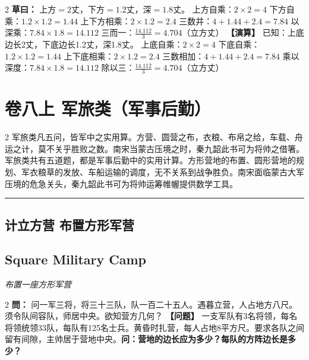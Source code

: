 \documentclass[11pt,a4paper]{article}
\newcommand{\longline}{\noindent\rule{\textwidth}{0.4pt}}
\newcommand{\bilingualProblem}[2]{%
  \vspace{0.6em}%
  \begin{paracol}{2}%
  \noindent\textcolor{problemcolor}{\textbf{問：}}#1%
  \switchcolumn%
  \noindent\textcolor{problemcolor}{\textbf{【问题】}}#2%
  \end{paracol}%
  \vspace{0.3em}%
}
\newcommand{\bilingualWorking}[2]{%
  \begin{paracol}{2}%
  \noindent\textcolor{workingcolor}{\textbf{草曰：}}#1%
  \switchcolumn%
  \noindent\textcolor{workingcolor}{\textbf{【演算】}}#2%
  \end{paracol}%
  \vspace{0.3em}%
}
\newcommand{\bilingualSubsection}[2]{%
  \subsection{#1}
  \begin{center}
  {\small\color{sectioncolor}\textit{#2}}
  \end{center}
  \vspace{0.3em}
}
\begin{document}
\bilingualWorking{%
上方$=2$丈，下方$=1.2$丈，深$=1.8$丈。
上方自乘：$2 \times 2 = 4$
下方自乘：$1.2 \times 1.2 = 1.44$
上下方相乘：$2 \times 1.2 = 2.4$
三数并：$4 + 1.44 + 2.4 = 7.84$
以深乘：$7.84 \times 1.8 = 14.112$
三而一：$\displaystyle\frac{14.112}{3} = 4.704$（立方丈）%
}{%
已知：上底边长2丈，下底边长1.2丈，深1.8丈。
上底自乘：$2 \times 2 = 4$
下底自乘：$1.2 \times 1.2 = 1.44$
上下底相乘：$2 \times 1.2 = 2.4$
三数相加：$4 + 1.44 + 2.4 = 7.84$
乘以深度：$7.84 \times 1.8 = 14.112$
除以三：$\displaystyle\frac{14.112}{3} = 4.704$（立方丈）%
}

\newpage

\section{卷八上 \quad 军旅类（军事后勤）}
\label{sec:fasc8a}

\begin{center}
\end{center}

\medskip

\begin{paracol}{2}
军旅类凡五问，皆军中之实用算。方营、圆营之布，衣粮、布帛之给，车载、舟运之计，莫不关乎胜败之数。南宋当蒙古压境之时，秦九韶此书可为将帅之借箸。
\switchcolumn
军旅类共有五道题，都是军事后勤中的实用计算。方形营地的布置、圆形营地的规划、军衣粮草的发放、车船运输的调度，无不关系到战争胜负。南宋面临蒙古大军压境的危急关头，秦九韶此书可为将帅运筹帷幄提供数学工具。
\end{paracol}

\vspace{0.8em}
\longline

\subsection{计立方营 \quad 布置方形军营}
\bilingualSubsection{Square Military Camp}{布置一座方形军营}

\bilingualProblem{%
问一军三将，将三十三队，队一百二十五人。遇暮立营，人占地方八尺。须令队间容队，师居中央。欲知营方几何？%
}{%
一支军队有3名将领，每名将领统领33队，每队有125名士兵。黄昏时扎营，每人占地8平方尺。要求各队之间留有间隙，主帅居于营地中央。\textbf{问：营地的边长应为多少？每队的方阵边长是多少？}%
}
\end{document}
